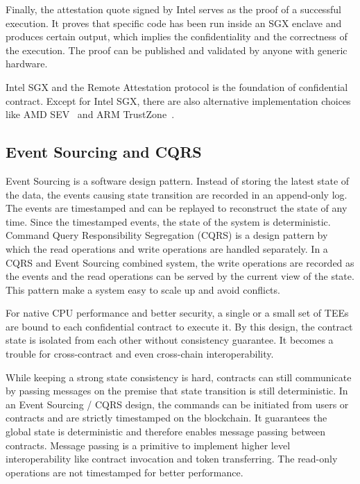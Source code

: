 Finally, the attestation quote signed by Intel serves as the proof of a successful execution. It proves that specific code has been run inside an SGX enclave and produces certain output, which implies the confidentiality and the correctness of the execution. The proof can be published and validated by anyone with generic hardware.

Intel SGX and the Remote Attestation protocol is the foundation of confidential contract. Except for Intel SGX, there are also alternative implementation choices like AMD SEV~\cite{xxx} and ARM TrustZone~\cite{xxx}.

\subsection{Event Sourcing and CQRS}

Event Sourcing is a software design pattern. Instead of storing the latest state of the data, the events causing state transition are recorded in an append-only log. The events are timestamped and can be replayed to reconstruct the state of any time. Since the timestamped events, the state of the system is deterministic. Command Query Responsibility Segregation (CQRS) is a design pattern by which the read operations and write operations are handled separately. In a CQRS and Event Sourcing combined system, the write operations are recorded as the events and the read operations can be served by the current view of the state. This pattern make a system easy to scale up and avoid conflicts.

For native CPU performance and better security, a single or a small set of TEEs are bound to each confidential contract to execute it. By this design, the contract state is isolated from each other without consistency guarantee. It becomes a trouble for cross-contract and even cross-chain interoperability.

While keeping a strong state consistency is hard, contracts can still communicate by passing messages on the premise that state transition is still deterministic. In an Event Sourcing / CQRS design, the commands can be initiated from users or contracts and are strictly timestamped on the blockchain. It guarantees the global state is deterministic and therefore enables message passing between contracts. Message passing is a primitive to implement higher level interoperability like contract invocation and token transferring. The read-only operations are not timestamped for better performance.
